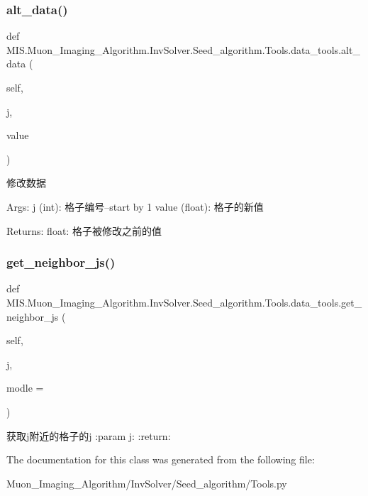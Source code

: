 \subsubsection{\texorpdfstring{alt\+\_\+data()}{alt\_data()}}
{\footnotesize\ttfamily def M\+I\+S.\+Muon\+\_\+\+Imaging\+\_\+\+Algorithm.\+Inv\+Solver.\+Seed\+\_\+algorithm.\+Tools.\+data\+\_\+tools.\+alt\+\_\+data (\begin{DoxyParamCaption}\item[{}]{self,  }\item[{}]{j,  }\item[{}]{value }\end{DoxyParamCaption})}

\begin{DoxyVerb}修改数据

Args:
    j (int): 格子编号--start by 1
    value (float): 格子的新值

Returns:
    float: 格子被修改之前的值
\end{DoxyVerb}
 \mbox{\label{classMIS_1_1Muon__Imaging__Algorithm_1_1InvSolver_1_1Seed__algorithm_1_1Tools_1_1data__tools_abcb462256b5285df4932d473ea0f7a73}} 
\subsubsection{\texorpdfstring{get\+\_\+neighbor\+\_\+js()}{get\_neighbor\_js()}}
{\footnotesize\ttfamily def M\+I\+S.\+Muon\+\_\+\+Imaging\+\_\+\+Algorithm.\+Inv\+Solver.\+Seed\+\_\+algorithm.\+Tools.\+data\+\_\+tools.\+get\+\_\+neighbor\+\_\+js (\begin{DoxyParamCaption}\item[{}]{self,  }\item[{}]{j,  }\item[{}]{modle = {} }\end{DoxyParamCaption})}

\begin{DoxyVerb}获取j附近的格子的j
:param j:
:return:
\end{DoxyVerb}
 

The documentation for this class was generated from the following file\+:\begin{DoxyCompactItemize}
\item 
Muon\+\_\+\+Imaging\+\_\+\+Algorithm/\+Inv\+Solver/\+Seed\+\_\+algorithm/Tools.\+py\end{DoxyCompactItemize}
